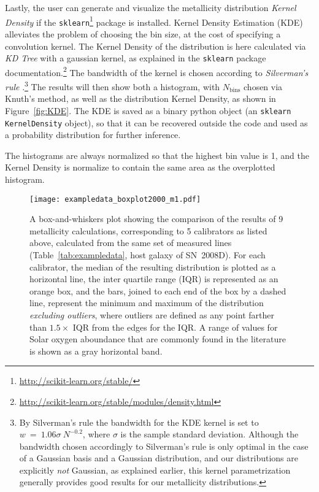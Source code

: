\documentclass{emulateapj} \usepackage{amsmath} \usepackage{float}
\begin{document}
Lastly, the user can generate and visualize the metallicity
distribution \emph{Kernel Density} if the
\verb=sklearn=\footnote{\url{http://scikit-learn.org/stable/}} package
is installed. Kernel Density Estimation (KDE) alleviates the problem
of choosing the bin size, at the cost of specifying a convolution
kernel. The Kernel Density of the distribution is here calculated via
\emph{KD Tree} with a gaussian kernel, as explained in the
\verb=sklearn= package
documentation.\footnote{\url{http://scikit-learn.org/stable/modules/density.html}}
The bandwidth of the kernel is chosen according to \emph{Silverman's
  rule} \citep{silverman86}.\footnote{By Silverman's rule the
  bandwidth for the KDE kernel is set to $w~=~1.06\sigma~N^{-0.2}$,
  where $\sigma$ is the sample standard deviation. Although the
  bandwidth chosen accordingly to Silverman's rule is only optimal in
  the case of a Gaussian basis and a Gaussian distribution, and our
  distributions are explicitly \emph{not} Gaussian, as explained
  earlier, this kernel parametrization generally provides good results
  for our metallicity distributions.} The results will then show both
a histogram, with $N_\mathrm{bins}$ chosen via Knuth's method, as well
as the distribution Kernel Density, as shown in
Figure~\ref{fig:KDE}. The KDE is saved as a binary python object (an
\verb=sklearn= \verb=KernelDensity= object), so that it can be
recovered outside the code and used as a probability distribution for
further inference.

The histograms are always normalized so that the highest bin value is
1, and the Kernel Density is normalize to contain the same area as the
overplotted histogram.


\begin{figure}[ht!]
  \texttt{[image: exampledata\_boxplot2000\_m1.pdf]}
   \caption{A box-and-whiskers plot showing the comparison of the
     results of 9 metallicity calculations, corresponding to 5
     calibrators as listed above, calculated from the same set of
     measured lines (Table~\ref{tab:exampledata}, host galaxy of
     SN~2008D). For each calibrator, the median of the resulting
     distribution is plotted as a horizontal line, the inter quartile
     range (IQR) is represented as an orange box, and the bars, joined
     to each end of the box by a dashed line, represent the minimum
     and maximum of the distribution \emph{excluding outliers}, where
     outliers are defined as any point farther than $1.5\times$ IQR
     from the edges for the IQR. A range of values for Solar oxygen
     aboundance that are commonly found in the literature is shown as
     a gray horizontal band.}
 \label{boxplot}
\end{figure}
\end{document}
